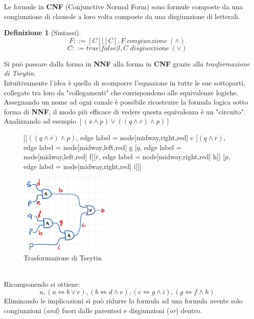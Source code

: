 \documentclass[a4paper]{article}
\newtheorem*{definition}{Definizione}
\begin{document}
Le formule in \textbf{CNF} (Conjunctive Normal Form) sono formule composte da una congiunzione di clausole a loro volta composte da una disgiunzione di letterali.
\begin{definition}[Sintassi]
	$$F::= [C]|[C],F \; congiunzione \: (\land)$$
	$$C::=true|false|l,C \; disgiunzione \: (\lor)$$
\end{definition}
Si può passare dalla forma in \textbf{NNF} alla forma in \textbf{CNF} grazie alla \textit{trasformazione di Tseytin}.\\
Intuitivamente l'idea è quella di scomporre l'equazione in tutte le sue sottoparti, collegate tra loro da "collegamenti" che corrispondono alle equivalenze logiche.
Assegnando un nome ad ogni canale è possibile ricostruire la formula logica sotto forma di \textbf{NNF}, il modo più efficace di vedere questa equivalenza è un "circuito".
Analizzando ad esempio $[(\overline s \land p) \lor ((q \land \overline r) \land p)]$
\begin{figure}[!ht]
\centering
\begin{forest}
	[$(\overline s \land p) \lor ((q \land \overline r) \land p)$[$\overline s \land p$, , edge label = {node[midway,left,red] {b}} [$\overline s$, , edge label = {node[midway,left,red] {d}}][$p$,, edge label = {node[midway,right,red] {e}}]][$((q \land \overline r) \land p)$, edge label = {node[midway,right,red] {c}} [$(q \land \overline r)$, edge label = {node[midway,left,red] {g}} [$q$, edge label = {node[midway,left,red] {f}}][$\overline r$, edge label = {node[midway,right,red] {h}}]] [$p$, edge label = {node[midway,right,red] {i}}]]]
\end{forest}
\includegraphics[width=0.4\textwidth]{./img/E7_circuit}
\caption{Trasformazione di Tseytin} \label{FIG:E7_circuit}
\end{figure}\\
Ricomponendo si ottiene:
$$ a,(a \Leftrightarrow b \lor c), (b \Leftrightarrow d \land e), (c \Leftrightarrow g \land i), (g \Leftrightarrow f \land h)$$
Eliminando le implicazioni si può ridurre la formula ad una formula avente solo congiunzioni (\textit{and}) fuori dalle parentesi e disgiunzioni (\textit{or}) dentro.
\end{document}
